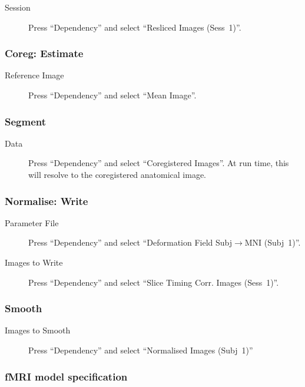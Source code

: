 \begin{description}
\item[Session] Press ``Dependency'' and select ``Resliced Images (Sess~1)''.
\end{description}

\subsubsection*{Coreg: Estimate}

\begin{description}
\item[Reference Image] Press ``Dependency'' and select ``Mean Image''.
\end{description}

\subsubsection*{Segment}

\begin{description}
\item[Data] Press ``Dependency'' and select ``Coregistered Images''. At run
  time, this will resolve to the coregistered anatomical image.
\end{description}

\subsubsection*{Normalise: Write}

\begin{description}
\item[Parameter File] Press ``Dependency'' and select ``Deformation Field
  Subj$\rightarrow$MNI (Subj~1)''.
\item[Images to Write] Press ``Dependency'' and select ``Slice Timing
  Corr. Images (Sess~1)''. 
\end{description}

\subsubsection*{Smooth}

\begin{description}
\item[Images to Smooth] Press ``Dependency'' and select ``Normalised Images
  (Subj~1)''
\end{description}

\subsubsection*{fMRI model specification}

